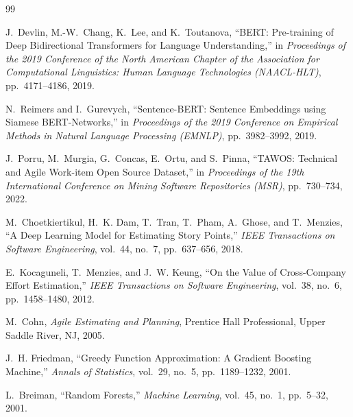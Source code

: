 \documentclass[11pt,a4paper]{article}
\begin{document}
\begin{thebibliography}{99}

J.~Devlin, M.-W.~Chang, K.~Lee, and K.~Toutanova,
\newblock ``BERT: Pre-training of Deep Bidirectional Transformers for Language Understanding,''
\newblock in \emph{Proceedings of the 2019 Conference of the North American Chapter of the Association for Computational Linguistics: Human Language Technologies (NAACL-HLT)}, pp.~4171--4186, 2019.

N.~Reimers and I.~Gurevych,
\newblock ``Sentence-BERT: Sentence Embeddings using Siamese BERT-Networks,''
\newblock in \emph{Proceedings of the 2019 Conference on Empirical Methods in Natural Language Processing (EMNLP)}, pp.~3982--3992, 2019.

J.~Porru, M.~Murgia, G.~Concas, E.~Ortu, and S.~Pinna,
\newblock ``TAWOS: Technical and Agile Work-item Open Source Dataset,''
\newblock in \emph{Proceedings of the 19th International Conference on Mining Software Repositories (MSR)}, pp.~730--734, 2022.

M.~Choetkiertikul, H.~K. Dam, T.~Tran, T.~Pham, A.~Ghose, and T.~Menzies,
\newblock ``A Deep Learning Model for Estimating Story Points,''
\newblock \emph{IEEE Transactions on Software Engineering}, vol.~44, no.~7, pp.~637--656, 2018.

E.~Kocaguneli, T.~Menzies, and J.~W. Keung,
\newblock ``On the Value of Cross-Company Effort Estimation,''
\newblock \emph{IEEE Transactions on Software Engineering}, vol.~38, no.~6, pp.~1458--1480, 2012.

M.~Cohn,
\newblock \emph{Agile Estimating and Planning},
\newblock Prentice Hall Professional, Upper Saddle River, NJ, 2005.

J.~H. Friedman,
\newblock ``Greedy Function Approximation: A Gradient Boosting Machine,''
\newblock \emph{Annals of Statistics}, vol.~29, no.~5, pp.~1189--1232, 2001.

L.~Breiman,
\newblock ``Random Forests,''
\newblock \emph{Machine Learning}, vol.~45, no.~1, pp.~5--32, 2001.

\end{thebibliography}
\end{document}
